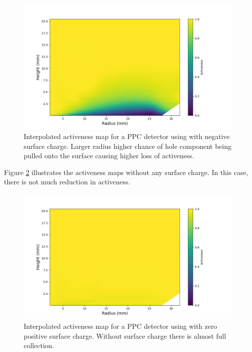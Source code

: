 \begin{figure}%
\centering
\includegraphics[trim={1.4cm 0.5cm 3.2cm 1.755cm},clip,width=0.9\linewidth]{ch5/figs/activeness_map_cubic_sc=-0.3_ponama_1_5000.png}
\caption{Interpolated activeness map for a PPC detector using \ehd with negative surface charge. Larger radius higher chance of hole component being pulled onto the surface causing higher loss of activeness.}
\label{ch5_fig_activeness_map_neg}
\end{figure}

Figure \ref{ch5_fig_interpolated_activeness_map_0} illustrates the activeness maps without any surface charge. In this case, there is not much reduction in activeness. 

\begin{figure}%
\centering
\includegraphics[trim={1.5cm 0cm 3.3cm 1cm},clip,width=0.9\linewidth]{ch5/figs/activeness_map_cubic_sc=0_ponama_1_5000.png}
\caption{Interpolated activeness map for a PPC detector using \ehd with zero positive surface charge. Without surface charge there is almost full collection.}
\label{ch5_fig_interpolated_activeness_map_0}
\end{figure}

